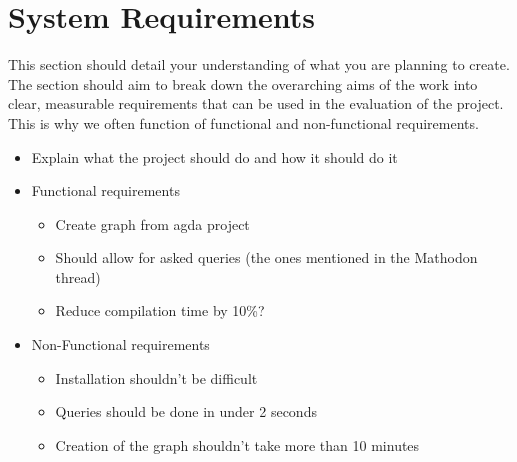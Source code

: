 
\chapter{System Requirements}

This section should detail your understanding of what you are planning to
create. The section should aim to break down the overarching aims of the work into clear,
measurable requirements that can be used in the evaluation of the project. This is why we often
function of functional and non-functional requirements.

\begin{itemize}
\item Explain what the project should do and how it should do it 
\item Functional requirements
\begin{itemize}
    \item Create graph from agda project
    \item Should allow for asked queries (the ones mentioned in the Mathodon thread)
    \item Reduce compilation time by 10\%? 
    \end{itemize} 
\item Non-Functional requirements
    \begin{itemize}
    \item Installation shouldn't be difficult
    \item Queries should be done in under 2 seconds 
    \item Creation of the graph shouldn't take more than 10 minutes 
    \end{itemize}
\end{itemize}
